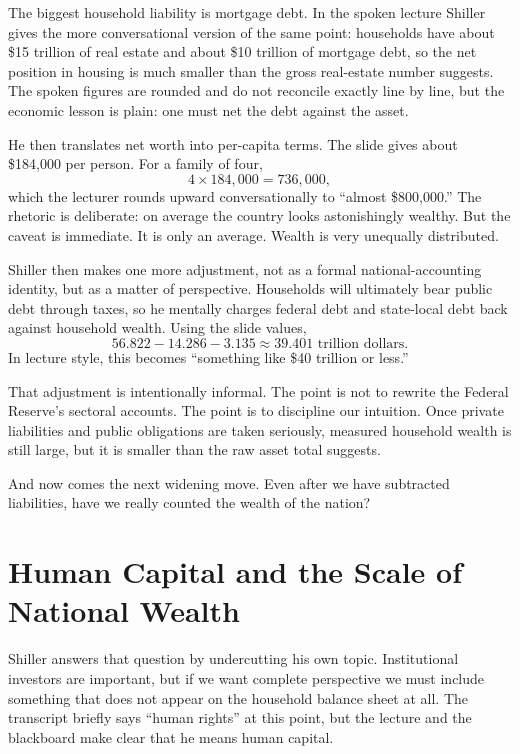The biggest household liability is mortgage debt. In the spoken lecture Shiller gives the more conversational version of the same point: households have about \$15 trillion of real estate and about \$10 trillion of mortgage debt, so the net position in housing is much smaller than the gross real-estate number suggests. The spoken figures are rounded and do not reconcile exactly line by line, but the economic lesson is plain: one must net the debt against the asset.

He then translates net worth into per-capita terms. The slide gives about \$184{,}000 per person. For a family of four,
\begin{equation}
4 \times 184{,}000 = 736{,}000,
\end{equation}
which the lecturer rounds upward conversationally to ``almost \$800{,}000.'' The rhetoric is deliberate: on average the country looks astonishingly wealthy. But the caveat is immediate. It is only an average. Wealth is very unequally distributed.

Shiller then makes one more adjustment, not as a formal national-accounting identity, but as a matter of perspective. Households will ultimately bear public debt through taxes, so he mentally charges federal debt and state-local debt back against household wealth. Using the slide values,
\begin{equation}
56.822 - 14.286 - 3.135 \approx 39.401 \text{ trillion dollars}.
\end{equation}
In lecture style, this becomes ``something like \$40 trillion or less.''

That adjustment is intentionally informal. The point is not to rewrite the Federal Reserve's sectoral accounts. The point is to discipline our intuition. Once private liabilities and public obligations are taken seriously, measured household wealth is still large, but it is smaller than the raw asset total suggests.

And now comes the next widening move. Even after we have subtracted liabilities, have we really counted the wealth of the nation?

\section{Human Capital and the Scale of National Wealth}

Shiller answers that question by undercutting his own topic. Institutional investors are important, but if we want complete perspective we must include something that does not appear on the household balance sheet at all. The transcript briefly says ``human rights'' at this point, but the lecture and the blackboard make clear that he means human capital.

